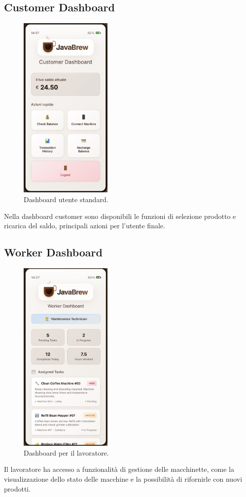 \subsection{Customer Dashboard}
\begin{figure}[H]
    \centering
    \includegraphics[width=0.4\textwidth]{./assets/customer.png}
    \caption{Dashboard utente standard.}
\end{figure}
Nella dashboard customer sono disponibili le funzioni di selezione prodotto e ricarica del saldo, principali azioni per l’utente finale.

\subsection{Worker Dashboard}
\begin{figure}[H]
    \centering
    \includegraphics[width=0.4\textwidth]{./assets/worker.png}
    \caption{Dashboard per il lavoratore.}
\end{figure}
Il lavoratore ha accesso a funzionalità di gestione delle macchinette, come la visualizzazione dello stato delle macchine e la possibilità di rifornirle con nuovi prodotti.
